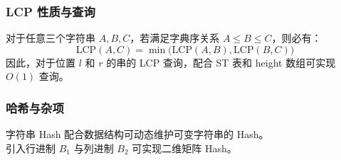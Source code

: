 \subsubsection*{LCP 性质与查询}
\noindent
对于任意三个字符串 $A, B, C$，若满足字典序关系 $A \le B \le C$，则必有：
\[
\text{LCP}(A, C) = \min\Big(\text{LCP}(A, B), \text{LCP}(B, C)\Big)
\]
因此，对于位置 $l$ 和 $r$ 的串的 LCP 查询，配合 ST 表和 height 数组可实现 $O(1)$ 查询。

\subsubsection*{哈希与杂项}
\noindent
字符串 Hash 配合数据结构可动态维护可变字符串的 Hash。\\
引入行进制 $B_1$ 与列进制 $B_2$ 可实现二维矩阵 Hash。


